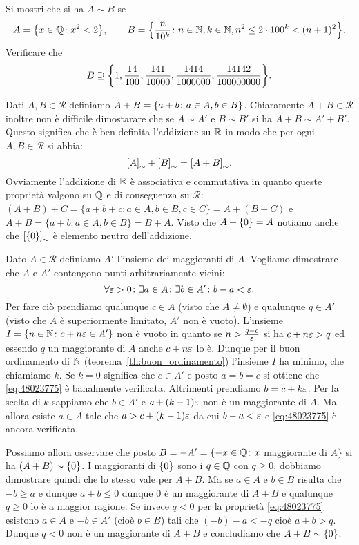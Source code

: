 \begin{exercise}
  Si mostri che si ha $A\sim B$ se
  \[
  A = {\left\{ x\in {\mathbb Q}\colon x^2<2 \right\}}, \qquad
  B = {\left\{ \frac{n}{10^k}\colon n\in {\mathbb N}, k\in {\mathbb N}, n^2 \le 2\cdot 100^k < (n+1)^2 \right\}}.  
  \]
  Verificare che 
  \[
    B \supseteq {\left\{ 
      1,\frac{14}{100},\frac{141}{10000},\frac{1414}{1000000},
      \frac{14142}{100000000} \right\}}.
  \]
\end{exercise}

Dati $A,B\in\mathcal R$ definiamo $A+B={\left\{ a+b\colon a\in A, b\in B \right\}}$.
Chiaramente $A+B\in \mathcal R$ inoltre non è difficile dimostarare che 
se $A\sim A'$ e $B\sim B'$ si ha $A+B\sim A'+B'$.
Questo significa che è ben definita l'addizione su ${\mathbb R}$ in modo che 
per ogni $A,B \in \mathcal R$ si abbia:
\[
{\left[ A \right]}_\sim + {\left[ B \right]}_\sim = {\left[ A+B \right]}_\sim.
\]
Ovviamente l'addizione di ${\mathbb R}$ è associativa e commutativa in quanto 
queste proprietà valgono su ${\mathbb Q}$ e di conseguenza su $\mathcal R$:
$(A+B)+C = \{ a+b+c\colon a\in A, b\in B, c\in C\} = A + (B+C)$ e 
$A+B = \{a+b\colon a\in A, b\in B\} = B+A$.
Visto che $A+{\left\{ 0 \right\}} = A$ notiamo anche che ${\left[ {\left\{ 0 \right\}} \right]}_\sim$ 
è elemento neutro dell'addizione.

Dato $A\in \mathcal R$ definiamo $A'$ l'insieme dei maggioranti di $A$.
Vogliamo dimostrare che $A$ e $A'$ contengono punti arbitrariamente vicini:
\begin{equation}\label{eq:48023775}
\forall \varepsilon>0\colon\exists a \in A\colon \exists b\in A'\colon
b-a < \varepsilon.
\end{equation}
Per fare ciò prendiamo qualunque $c\in A$ (visto che $A\neq \emptyset$)
e qualunque $q\in A'$ (visto che $A$ è superiormente limitato, $A'$ non è vuoto).
L'insieme $I={\left\{ n\in {\mathbb N} \colon c+n\varepsilon\in A' \right\}}$
non è vuoto in quanto se $n>\frac{q-c}{\varepsilon}$ si ha $c+n\varepsilon>q$ ed essendo $q$ 
un maggiorante di $A$ anche $c+n\varepsilon$ lo è.
Dunque per il buon ordinamento di ${\mathbb N}$ (teorema~\ref{th:buon_ordinamento})
l'insieme $I$ ha minimo, che chiamiamo $k$.
Se $k=0$ significa che $c\in A'$ e posto $a=b=c$ si ottiene 
che \eqref{eq:48023775} è banalmente verificata.
Altrimenti prendiamo $b=c+k\varepsilon$.
Per la scelta di $k$ sappiamo che $b\in A'$ e $c+(k-1)\varepsilon$ non è un maggiorante di 
$A$. 
Ma allora esiste $a\in A$ tale che $a>c+(k-1)\varepsilon$ da cui 
$b-a < \varepsilon$ e \eqref{eq:48023775} è ancora verificata.

Possiamo allora osservare che posto $B=-A' = \{-x\in {\mathbb Q} \colon x$ maggiorante di $A\}$
si ha $(A+B)\sim{\left\{ 0 \right\}}$. 
I maggioranti di ${\left\{ 0 \right\}}$ sono i $q\in {\mathbb Q}$ con $q\ge 0$, 
dobbiamo dimostrare quindi che lo stesso vale per $A+B$.
Ma se $a\in A$ e $b\in B$ risulta che $-b\ge a$ e dunque $a+b\le 0$ 
dunque $0$ è un maggiorante di $A+B$ e qualunque $q\ge 0$ lo è a maggior ragione.
Se invece $q<0$ per la proprietà \eqref{eq:48023775} esistono $a\in A$ 
e $-b\in A'$ (cioè $b\in B$) tali che $(-b)-a<-q$ cioè $a+b>q$. Dunque 
$q<0$ non è un maggiorante di $A+B$ e concludiamo che $A+B\sim{\left\{ 0 \right\}}$.

